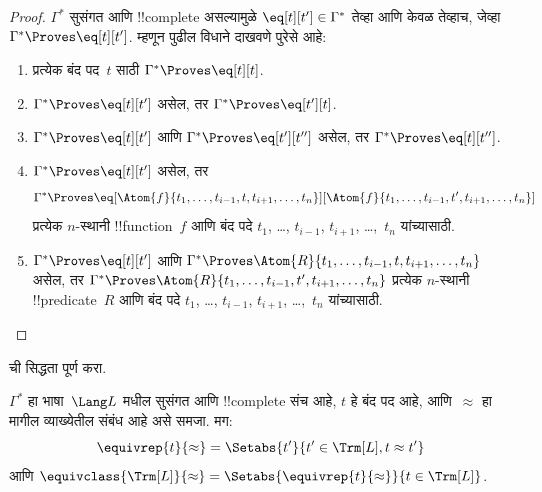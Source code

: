 \documentclass[../../../include/open-logic-section]{subfiles}
\begin{document}
\begin{proof}
$\Gamma^*$ सुसंगत आणि !!{complete} असल्यामुळे $\eq[t][t'] \in
\Gamma^*$ तेव्हा आणि केवळ तेव्हाच, जेव्हा $\Gamma^* \Proves
\eq[t][t']$. म्हणून पुढील विधाने दाखवणे पुरेसे आहे:
\begin{enumerate}
\item प्रत्येक बंद पद~$t$ साठी $\Gamma^* \Proves \eq[t][t]$.
\item $\Gamma^* \Proves \eq[t][t']$ असेल, तर $\Gamma^* \Proves \eq[t'][t]$.
\item $\Gamma^* \Proves \eq[t][t']$ आणि $\Gamma^* \Proves
  \eq[t'][t'']$ असेल, तर $\Gamma^* \Proves \eq[t][t'']$.
\item $\Gamma^* \Proves \eq[t][t']$ असेल, तर
\[
\ifdefined\OLProvableEqualityDisplay\else
  \def\OLProvableEqualityDisplay#1#2#3{#1 \eq[#2][#3]}%
\fi
\OLProvableEqualityDisplay{\Gamma^* \Proves}%
  {\Atom{f}{t_1,\dots,t_{i-1},t,t_{i+1},\dots,t_n}}%
  {\Atom{f}{t_1,\dots,t_{i-1},t',t_{i+1},\dots,t_n}}
\]
प्रत्येक $n$-स्थानी !!{function}~$f$ आणि बंद पदे $t_1$, \dots,
$t_{i-1}$, $t_{i+1}$, \dots,~$t_n$ यांच्यासाठी.
\item $\Gamma^* \Proves \eq[t][t']$ आणि
$\Gamma^* \Proves
\Atom{R}{t_1,\dots,t_{i-1},t,t_{i+1},\dots,t_n}$ असेल, तर
$\Gamma^* \Proves \Atom{R}{t_1,\dots,t_{i-1},t',t_{i+1},\dots,t_n}$
प्रत्येक $n$-स्थानी !!{predicate}~$R$ आणि बंद पदे $t_1$, \dots,
$t_{i-1}$, $t_{i+1}$, \dots,~$t_n$ यांच्यासाठी.
\end{enumerate}
\end{proof}

\begin{prob}
 ची सिद्धता पूर्ण करा.
\end{prob}

\begin{defn}
$\Gamma^*$ हा भाषा~$\Lang L$ मधील सुसंगत आणि !!{complete} संच आहे,
$t$ हे बंद पद आहे, आणि~$\approx$ हा मागील व्याख्येतील संबंध आहे असे
समजा. मग:
\[
\equivrep{t}{\approx} = \Setabs{t'}{t'\in \Trm[L], t \approx t'}
\]
आणि $\equivclass{\Trm[L]}{\approx} = \Setabs{\equivrep{t}{\approx}}{t \in \Trm[L]}$.
\end{defn}
\end{document}
